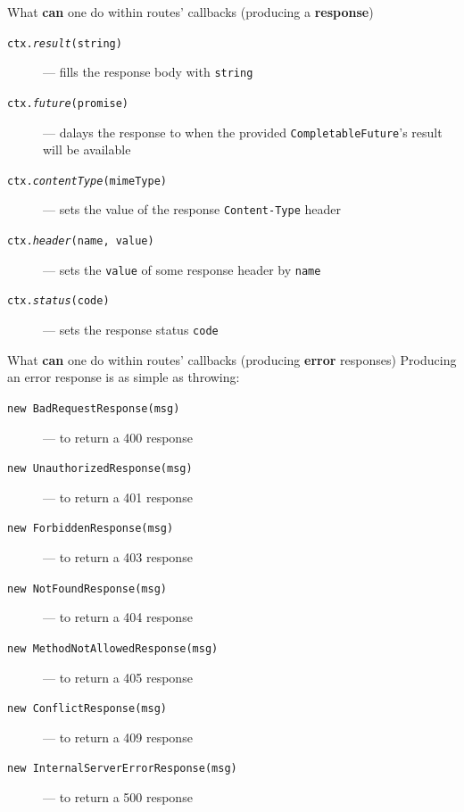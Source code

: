 \documentclass[presentation]{beamer}\mode<presentation>{\usetheme{AMSBolognaFC}}
\begin{document}
\begin{frame}[allowframebreaks]
    \begin{block}{What \textbf{can} one do within routes' callbacks (producing a \textbf{response})}
        \begin{description}
            \item[\texttt{ctx.\textit{result}(string)}] --- fills the response body with \texttt{string}
            \item[\texttt{ctx.\textit{future}(promise)}] --- dalays the response to when the provided \texttt{CompletableFuture}'s result will be available
            \item[\texttt{ctx.\textit{contentType}(mimeType)}] --- sets the value of the response \texttt{Content-Type} header
            \item[\texttt{ctx.\textit{header}(name, value)}] --- sets the \texttt{value} of some response header by \texttt{name}
            \item[\texttt{ctx.\textit{status}(code)}] --- sets the response status \texttt{code}
        \end{description}
    \end{block}

    \framebreak

    \begin{block}{What \textbf{can} one do within routes' callbacks (producing \textbf{error} responses)}
        Producing an error response is as simple as \alert{throwing}:
        \begin{description}
            \item[\texttt{new BadRequestResponse(msg)}] --- to return a 400 response
            \item[\texttt{new UnauthorizedResponse(msg)}] --- to return a 401 response
            \item[\texttt{new ForbiddenResponse(msg)}] --- to return a 403 response
            \item[\texttt{new NotFoundResponse(msg)}] --- to return a 404 response
            \item[\texttt{new MethodNotAllowedResponse(msg)}] --- to return a 405 response
            \item[\texttt{new ConflictResponse(msg)}] --- to return a 409 response
            \item[\texttt{new InternalServerErrorResponse(msg)}] --- to return a 500 response
        \end{description}
    \end{block}

    \framebreak


\end{frame}
\end{document}
